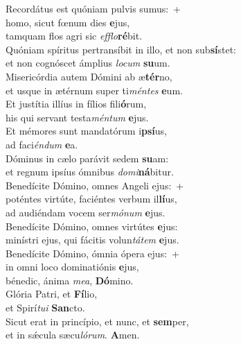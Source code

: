 \evenverse Recordátus est quóniam pulvis sumus:~+\\\evenverse  homo, sicut fœnum dies \textbf{e}jus,~\*\\
\evenverse tamquam flos agri sic \textit{ef}\textit{flo}\textbf{ré}bit.\\
\oddverse Quóniam spíritus pertransíbit in illo, et non sub\textbf{sí}stet:~\*\\
\oddverse et non cognóscet ámplius \textit{lo}\textit{cum} \textbf{su}um.\\
\evenverse Misericórdia autem Dómini ab æ\textbf{tér}no,~\*\\
\evenverse et usque in ætérnum super ti\textit{mén}\textit{tes} \textbf{e}um.\\
\oddverse Et justítia illíus in fílios fili\textbf{ó}rum,~\*\\
\oddverse his qui servant testa\textit{mén}\textit{tum} \textbf{e}jus.\\
\evenverse Et mémores sunt mandatórum i\textbf{psí}us,~\*\\
\evenverse ad faci\textit{én}\textit{dum} \textbf{e}a.\\
\oddverse Dóminus in cælo parávit sedem \textbf{su}am:~\*\\
\oddverse et regnum ipsíus ómnibus \textit{do}\textit{mi}\textbf{ná}bitur.\\
\evenverse Benedícite Dómino, omnes Angeli ejus:~+\\
\evenverse  poténtes virtúte, faciéntes verbum il\textbf{lí}us,~\*\\
\evenverse ad audiéndam vocem ser\textit{mó}\textit{num} \textbf{e}jus.\\
\oddverse Benedícite Dómino, omnes virtútes \textbf{e}jus:~\*\\
\oddverse minístri ejus, qui fácitis volun\textit{tá}\textit{tem} \textbf{e}jus.\\
\evenverse Benedícite Dómino, ómnia ópera ejus:~+\\
\evenverse  in omni loco dominatiónis \textbf{e}jus,~\*\\
\evenverse bénedic, ánima \textit{me}\textit{a}, \textbf{Dó}mino.\\
\oddverse Glória Patri, et \textbf{Fí}lio,~\*\\
\oddverse et Spirí\textit{tu}\textit{i} \textbf{San}cto.\\
\evenverse Sicut erat in princípio, et nunc, et \textbf{sem}per,~\*\\
\evenverse et in sǽcula sæcu\textit{ló}\textit{rum}. \textbf{A}men.\\
